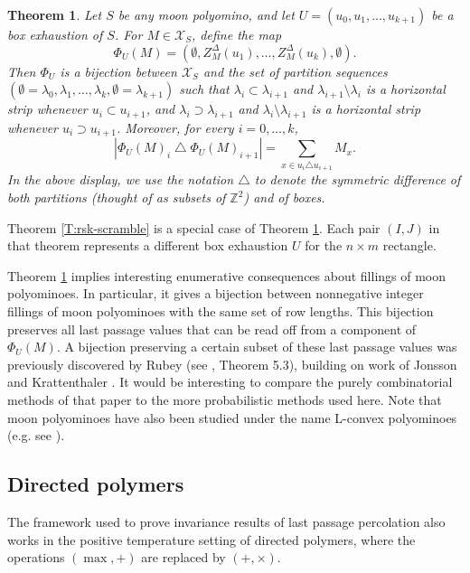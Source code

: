 \documentclass[aop, preprint]{imsart}
\theoremstyle{plain}
\newtheorem{theorem}{Theorem}[section]
\theoremstyle{definition}
\theoremstyle{plain}
\newcommand{\sset}{\subset}
\newcommand{\la}{\lambda}
\newcommand{\scrX}{\mathcal{X}}
\newcommand{\Z}{\mathds{Z}}
\newcommand{\X}{\times}
\newcommand{\symdif}{\triangle}
\newcommand{\smin}{\setminus}
\begin{document}
\begin{theorem}
	\label{T:rsk-moon-poly}
	Let $S$ be any moon polyomino, and let $U = (u_0, u_1, \dots, u_{k+1})$ be a box exhaustion of $S$. 
	For $M \in \scrX_S$, define the map
	$$
	\Phi_U(M) = (\emptyset, Z^\Delta_M(u_1), \dots, Z^\Delta_M(u_k), \emptyset).
	$$
	Then $\Phi_U$ is a bijection between $\scrX_S$ and the set of partition sequences $(\emptyset = \la_0, \la_1, \dots, \la_k, \emptyset = \la_{k+1})$ such that $\la_i \sset \la_{i+1}$ and $\la_{i+1} \smin \la_i$ is a horizontal strip whenever $u_i \sset u_{i+1}$, and $\la_i \supset \la_{i+1}$ and $\la_{i} \smin \la_{i+1}$ is a horizontal strip whenever $u_i \supset u_{i+1}$. Moreover, for every $i = 0, \dots, k$,
	$$
	|\Phi_U(M)_i \;\symdif \;\Phi_U(M)_{i+1}| = \sum_{x \in u_i \symdif u_{i+1}} M_x.
	$$ 
	In the above display, we use the notation $\symdif$ to denote the symmetric difference of both partitions (thought of as subsets of $\Z^2$) and of boxes.
\end{theorem}

Theorem \ref{T:rsk-scramble} is a special case of Theorem \ref{T:rsk-moon-poly}. Each pair $(I, J)$ in that theorem represents a different box exhaustion $U$ for the $n \X m$ rectangle.

Theorem \ref{T:rsk-moon-poly} implies interesting enumerative consequences about fillings of moon polyominoes. In particular, it gives a bijection between nonnegative integer fillings of moon polyominoes with the same set of row lengths. This bijection preserves all last passage values that can be read off from a component of $\Phi_U(M)$. A bijection preserving a certain subset of these last passage values was previously discovered by Rubey (see \citep{rubey2011increasing}, Theorem 5.3), building on work of Jonsson \cite{jonsson2005generalized} and Krattenthaler \citep{krattenthaler2005growth}. It would be interesting to compare the purely combinatorial methods of that paper to the more probabilistic methods used here. Note that moon polyominoes have also been studied under the name L-convex polyominoes (e.g. see \citep{castiglione2003reconstruction}).

\subsection{Directed polymers}
\label{SS:directed-limit}
The framework used to prove invariance results of last passage percolation also works in the positive temperature setting of directed polymers, where the operations $(\max, +)$ are replaced by $(+, \X)$. 
\end{document}
